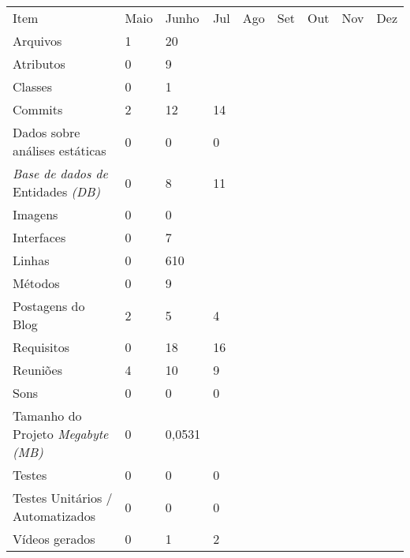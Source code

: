 \begin{table}
\centering
\begin{tabular}{lllllllll}
Item                                              & Maio & Junho  & Jul & Ago & Set & Out & Nov & Dez  \\
Arquivos                                          & 1    & 20     &     &       &         &      &     &      \\
Atributos                                         & 0    & 9      &     &       &         &      &     &      \\
Classes                                             & 0    & 1      &     &       &         &      &     &      \\
Commits                                      & 2    & 12     & 14  &       &         &      &     &      \\
Dados sobre análises estáticas                    & 0    & 0      & 0   &       &         &      &     &      \\
\textit{Base de dados de} Entidades \textit{(DB)} & 0    & 8      & 11  &       &         &      &     &      \\
Imagens                                           & 0    & 0      &     &       &         &      &     &      \\
Interfaces                                        & 0    & 7      &     &       &         &      &     &      \\
Linhas                                            & 0    & 610    &     &       &         &      &     &      \\
Métodos                                           & 0    & 9      &     &       &         &      &     &      \\
Postagens do Blog                                 & 2    & 5      & 4   &       &         &      &     &      \\
Requisitos                                        & 0    & 18     & 16  &       &         &      &     &      \\
Reuniões                                          & 4    & 10     & 9   &       &         &      &     &      \\
Sons                                            & 0    & 0      & 0   &       &         &      &     &      \\
Tamanho do Projeto \textit{Megabyte (MB)}         & 0    & 0,0531 &     &       &         &      &     &      \\
Testes                                            & 0    & 0      & 0   &       &         &      &     &      \\
Testes Unitários / Automatizados                  & 0    & 0      & 0   &       &         &      &     &      \\
Vídeos gerados                                    & 0    & 1      & 2   &       &         &      &     &     
\end{tabular}
\end{table}

